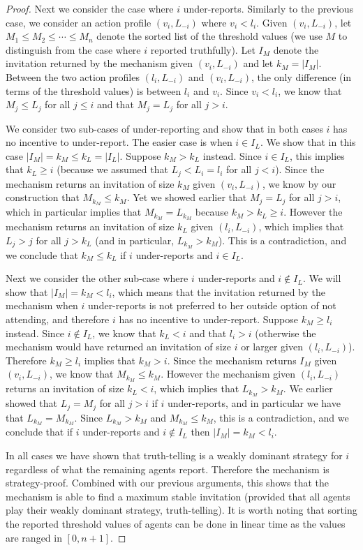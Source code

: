 \begin{proof}
	Next we consider the case where $i$ under-reports. Similarly to the previous case, we consider an action profile $(v_i, L_{-i})$ where $v_i < l_i$. Given $(v_i, L_{-i})$, let $M_1 \leq M_2 \leq \cdots \leq M_{n}$ denote the sorted list of the threshold values (we use $M$ to distinguish from the case where $i$ reported truthfully). Let $I_M$ denote the invitation returned by the mechanism given $(v_i, L_{-i})$ and let $k_M = |I_M|$. Between the two action profiles $(l_i, L_{-i})$ and $(v_i, L_{-i})$, the only difference (in terms of the threshold values) is between $l_i$ and $v_i$. Since $v_i < l_i$, we know that $M_j \leq L_j$ for all $j \leq i$ and that $M_j = L_j$ for all $j > i$. 

	We consider two sub-cases of under-reporting and show that in both cases $i$ has no incentive to under-report.  The easier case is when $i \in I_L$. We show that in this case $|I_M| = k_M \leq k_L = |I_L|$. Suppose $k_M > k_L$ instead. Since $i \in I_L$, this implies that $k_L \geq i$ (because we assumed that $L_j < L_i = l_i$ for all $j < i$). Since the mechanism returns an invitation of size $k_M$ given $(v_i, L_{-i})$, we know by our construction that $M_{k_M} \leq k_M$. Yet we showed earlier that $M_j = L_j$ for all $j > i$, which in particular implies that $M_{k_M} = L_{k_M}$ because $k_M > k_L \geq i$. However the mechanism returns an invitation of size $k_L$ given $(l_i, L_{-i})$, which implies that $L_j > j$ for all $j > k_L$ (and in particular, $L_{k_M} > k_M$). This is a contradiction, and we conclude that $k_M \leq k_L$ if $i$ under-reports and $i\in I_L$. 

	Next we consider the other sub-case where $i$ under-reports and $i\not\in I_L$. We will show that $|I_M| = k_M < l_i$, which means that the invitation returned by the mechanism when $i$ under-reports is not preferred to her outside option of not attending, and therefore $i$ has no incentive to under-report. Suppose $k_M \geq l_i$ instead. Since $i \not\in I_L$, we know that $k_L < i$ and that $l_i > i$ (otherwise the mechanism would have returned an invitation of size $i$ or larger given $(l_i, L_{-i})$). Therefore $k_M \geq l_i$ implies that $k_M > i$. Since the mechanism returns $I_M$ given $(v_i, L_{-i})$, we know that $M_{k_M} \leq k_M$. However the mechanism given $(l_i, L_{-i})$ returns an invitation of size $k_L < i$, which implies that $L_{k_M} > k_M$. We earlier showed that $L_j = M_j$ for all $j > i$ if $i$ under-reports, and in particular we have that $L_{k_M} = M_{k_M}$. Since $L_{k_M} > k_M$ and $M_{k_M} \leq k_M$, this is a contradiction, and we conclude that if $i$ under-reports and $i\not\in I_L$ then $|I_M| = k_M < l_i$. 

	In all cases we have shown that truth-telling is a weakly dominant strategy for $i$ regardless of what the remaining agents report. Therefore the mechanism is strategy-proof.  Combined with our previous arguments, this shows that the mechanism is able to find a maximum stable invitation (provided that all agents play their weakly dominant strategy, truth-telling). It is worth noting that sorting the reported threshold values of agents can be done in linear time as the values are ranged in $[0, n+1]$.
\end{proof} 	 

